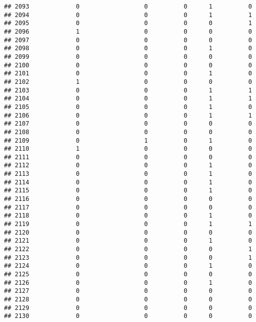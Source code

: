 \documentclass[
]{article}
\begin{document}
\begin{verbatim}
## 2093             0                  0          0      1          0
## 2094             0                  0          0      1          1
## 2095             0                  0          0      0          1
## 2096             1                  0          0      0          0
## 2097             0                  0          0      0          0
## 2098             0                  0          0      1          0
## 2099             0                  0          0      0          0
## 2100             0                  0          0      0          0
## 2101             0                  0          0      1          0
## 2102             1                  0          0      0          0
## 2103             0                  0          0      1          1
## 2104             0                  0          0      1          1
## 2105             0                  0          0      1          0
## 2106             0                  0          0      1          1
## 2107             0                  0          0      0          0
## 2108             0                  0          0      0          0
## 2109             0                  1          0      1          0
## 2110             1                  0          0      0          0
## 2111             0                  0          0      0          0
## 2112             0                  0          0      1          0
## 2113             0                  0          0      1          0
## 2114             0                  0          0      1          0
## 2115             0                  0          0      1          0
## 2116             0                  0          0      0          0
## 2117             0                  0          0      0          0
## 2118             0                  0          0      1          0
## 2119             0                  0          0      1          1
## 2120             0                  0          0      0          0
## 2121             0                  0          0      1          0
## 2122             0                  0          0      0          1
## 2123             0                  0          0      0          1
## 2124             0                  0          0      1          0
## 2125             0                  0          0      0          0
## 2126             0                  0          0      1          0
## 2127             0                  0          0      0          0
## 2128             0                  0          0      0          0
## 2129             0                  0          0      0          0
## 2130             0                  0          0      0          0

\end{verbatim}
\end{document}
